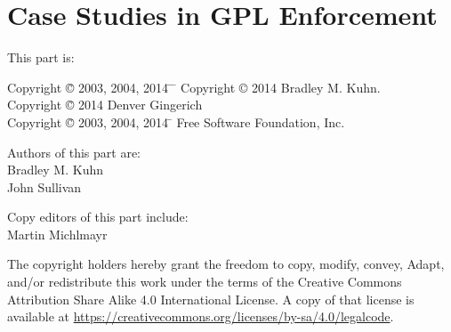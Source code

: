 





\part{Case Studies in GPL Enforcement}

{\parindent 0in
This part is: \\
\begin{tabbing}
Copyright \= \copyright{} 2003, 2004, 2014 \= \hspace{1.mm} \=  \kill
Copyright \> \copyright{} 2014 \>  Bradley M. Kuhn. \\
Copyright \= \copyright{} 2014 \> \hspace{.2in} Denver Gingerich \\
Copyright \= \copyright{} 2003, 2004, 2014 \= \hspace{.2in} Free Software Foundation, Inc. \\
\end{tabbing}

\vspace{1in}

\begin{center}
Authors of this part are: \\

Bradley M. Kuhn \\
John Sullivan
\vspace{3in}

Copy editors of this part include: \\
Martin Michlmayr

\vspace{3in}

The copyright holders hereby grant the freedom to copy, modify, convey,
Adapt, and/or redistribute this work under the terms of the Creative Commons
Attribution Share Alike 4.0 International License.  A copy of that license is
available at \url{https://creativecommons.org/licenses/by-sa/4.0/legalcode}.
\end{center}
}

